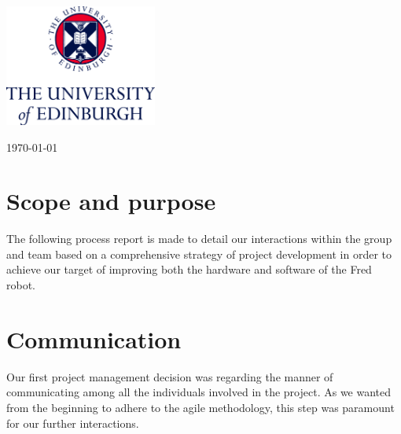 \documentclass[12pt,oneside]{article}
\begin{document}
\begin{titlepage}
		
		
		\vfill %
		
		\includegraphics[width=50mm,scale=0.5]{unilogo.jpg}\\[1cm] %
		
		
		\vfill %
		
		{\large \today}\\[2cm] %
	
		
	\end{titlepage}
	\section{Scope and purpose}
		The following process report is made to detail our interactions within the group and team based on a comprehensive strategy of project development in order to achieve our target of improving both the hardware and software of the Fred robot.
	\section{Communication}
		Our first project management decision was regarding the manner of communicating among all the individuals involved in the project. As we wanted from the beginning to adhere to the agile methodology, this step was paramount for our further interactions.
\end{document}
